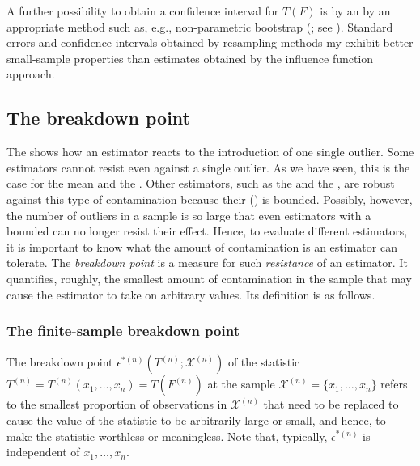 A further possibility to obtain a confidence interval for $T(F)$ is by an by an
appropriate  method such as, e.g., non-parametric bootstrap
(\citealp{davisonhinkley97}; see ). Standard errors and
confidence intervals obtained by resampling methods my exhibit better
small-sample properties than estimates obtained by the influence function
approach.


\subsection{The breakdown point}
\label{subsec:theory:BP}

The  shows how an estimator reacts to the introduction
of one single outlier. Some estimators cannot resist even against a
single outlier. As we have seen, this is the case for the mean and the
. Other estimators, such as the  and
the , are robust against this type of
contamination because their  () is
bounded. Possibly, however, the number of outliers in a sample is so large that
even estimators with a bounded  can no longer resist their effect.
Hence, to evaluate different estimators, it is important to know what the
amount of contamination is an estimator can tolerate. The
\emph{breakdown point} is a measure for such \emph{resistance} of an estimator.
It quantifies, roughly, the smallest amount of contamination in the
sample that may cause the estimator to take on arbitrary values. Its definition
is as follows.

\subsubsection{The finite-sample breakdown point}

The breakdown point $\epsilon^{*(n)}(T^{(n)}; \mathcal{X}^{(n)})$ of the statistic
$T^{(n)} = T^{(n)}(x_1, \dots, x_n) = T(F^{(n)})$ at the sample $\mathcal{X}^{(n)}
= \{x_1, \dots, x_n\}$ refers to the smallest proportion of observations
in $\mathcal{X}^{(n)}$ that need to be replaced to cause the value of the
statistic to be arbitrarily large or small, and hence, to make the statistic
worthless or meaningless. Note that, typically, $\epsilon^{*(n)}$ is
independent of $x_1, \dots, x_n$.


